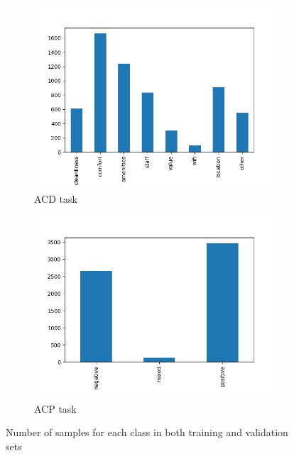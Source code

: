 \documentclass{article}
\begin{document}
        \begin{figure}
		    \centering
		    \begin{subfigure}{.5\textwidth}
  		        \centering
 		        \includegraphics[width=\textwidth]{imgs/acd_y_train_historgram.png}
  		        \caption{ACD task}
  		        \label{acd_y_train_historgram}
		    \end{subfigure}%
		    \begin{subfigure}{.5\textwidth}
 		        \centering
 		        \includegraphics[width=\textwidth]{imgs/acp_y_train_historgram.png}
 		        \caption{ACP task}
 		        \label{acp_y_train_historgram}
		    \end{subfigure}
		    \caption{Number of samples for each class in both training and validation sets}
		    \label{y_train_histograms}
	    \end{figure}
\end{document}
